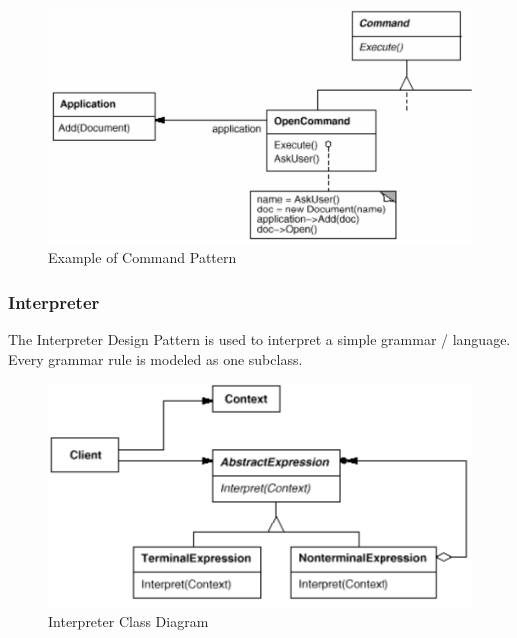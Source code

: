 \documentclass[11pt]{article}
\begin{document}
\begin{figure}[htbp]
\centering
\includegraphics[width=.9\linewidth]{img/example_of_command.png}
\caption{\label{fig:example-of-command-pattern}Example of Command Pattern}
\end{figure}

\subsubsection{Interpreter}
\label{sec:org358b7cd}
The Interpreter Design Pattern is used to interpret a simple grammar / language.
Every grammar rule is modeled as one subclass.


\begin{figure}[htbp]
\centering
\includegraphics[width=.9\linewidth]{img/interpreter.png}
\caption{\label{fig:interpreter-class-diagram}Interpreter Class Diagram}
\end{figure}
\end{document}
